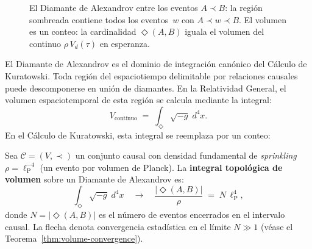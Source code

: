 \documentclass[11pt, a4paper, openany]{book}
\newcommand{\lP}{\ell_{\mathrm{P}}}
\newcommand{\diam}[2]{\Diamond(#1,#2)}
\begin{document}
\begin{figure}[ht]
\centering
{}
\caption{El Diamante de Alexandrov entre los eventos $A \prec B$: la
regi\'on sombreada contiene todos los eventos~$w$ con
$A \prec w \prec B$. El volumen es un conteo: la cardinalidad
$\diam{A}{B}$ iguala el volumen del continuo $\rho\,V_d(\tau)$ en
esperanza.}
\label{fig:diamante-alexandrov}
\end{figure}

\noindent
El Diamante de Alexandrov es el dominio de integraci\'on can\'onico
del C\'alculo de Kuratowski. Toda regi\'on del espaciotiempo
delimitable por relaciones causales puede descomponerse en uni\'on de
diamantes. En la Relatividad General, el volumen espaciotemporal de
esta regi\'on se calcula mediante la integral:
\begin{equation}
  V_{\text{continuo}} \;=\;
  \int_{\Diamond} \sqrt{-g}\; d^4x.
  \label{eq:volume-continuum}
\end{equation}
En el C\'alculo de Kuratowski, esta integral se reemplaza por un
conteo:

\begin{definition}
\label{def:topological-integral}
Sea $\mathcal{C} = (V, \prec)$ un conjunto causal con densidad
fundamental de \emph{sprinkling}
$\rho = \lP^{-4}$ (un evento por volumen de Planck). La
\textbf{integral topol\'ogica de volumen} sobre un
Diamante de Alexandrov es:
\begin{equation}
  \boxed{\;
  \int_{\Diamond} \sqrt{-g}\; d^4x
  \quad\longrightarrow\quad
  \frac{|\diam{A}{B}|}{\rho}
  \;=\; N\,\lP^4,
  \;}
  \label{eq:volume-discrete}
\end{equation}
donde $N = |\diam{A}{B}|$ es el n\'umero de eventos encerrados en
el intervalo causal. La flecha denota convergencia estad\'istica en
el l\'imite $N \gg 1$ (v\'ease el Teorema~\ref{thm:volume-convergence}).
\end{definition}
\end{document}
